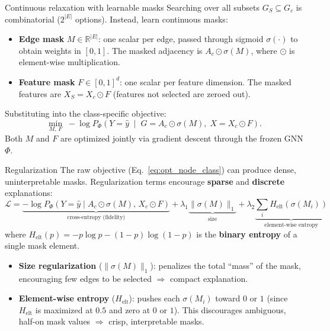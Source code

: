\documentclass[xcolor=svgnames,aspectratio=169]{beamer}
\begin{document}
\begin{frame}{Continuous relaxation with learnable masks}
    Searching over all subsets $G_S \subseteq G_c$ is combinatorial ($2^{|E|}$ options). Instead, learn continuous masks:
    \begin{itemize}
        \item \textbf{Edge mask} $M \in \mathbb{R}^{|E|}$: one scalar per edge, passed through sigmoid $\sigma(\cdot)$ to obtain weights in $[0,1]$.
        The masked adjacency is $A_c \odot \sigma(M)$, where $\odot$ is element-wise multiplication.
        \item \textbf{Feature mask} $F \in [0,1]^{d}$: one scalar per feature dimension.
        The masked features are $X_S = X_c \odot F$ (features not selected are zeroed out).
    \end{itemize}
    \vspace{4pt}
    Substituting into the class-specific objective:
    \begin{equation}
        \label{eq:opt_node_class}
        \min_{M,\, F}  \;-\log P_\Phi\!\left(Y = \hat{y} \;\middle|\; G = A_c \odot \sigma(M),\; X = X_c \odot F\right).
    \end{equation}
    Both $M$ and $F$ are optimized jointly via gradient descent through the frozen GNN $\Phi$.
\end{frame}

\begin{frame}{Regularization}
    The raw objective (Eq.~\ref{eq:opt_node_class}) can produce dense, uninterpretable masks. Regularization terms encourage \textbf{sparse} and \textbf{discrete} explanations:
    \begin{equation}
        \label{eq:full_loss}
        \mathcal{L} = \underbrace{-\log P_\Phi(Y\!=\!\hat{y} \mid A_c \odot \sigma(M),\, X_c \odot F)}_{\text{cross-entropy (fidelity)}}
        + \lambda_1 \underbrace{\|\sigma(M)\|_1}_{\text{size}}
        + \lambda_2 \underbrace{\sum_i H_{\mathrm{elt}}(\sigma(M_i))}_{\text{element-wise entropy}}
    \end{equation}
    where $H_{\mathrm{elt}}(p) = -p\log p - (1-p)\log(1-p)$ is the \textbf{binary entropy} of a single mask element.
    \vspace{4pt}
    \begin{itemize}
        \item \textbf{Size regularization} ($\|\sigma(M)\|_1$): penalizes the total ``mass'' of the mask, encouraging few edges to be selected $\Rightarrow$ compact explanation.
        \item \textbf{Element-wise entropy} ($H_{\mathrm{elt}}$): pushes each $\sigma(M_i)$ toward $0$ or $1$ (since $H_{\mathrm{elt}}$ is maximized at $0.5$ and zero at $0$ or $1$).  This discourages ambiguous, half-on mask values $\Rightarrow$ crisp, interpretable masks.
    \end{itemize}
\end{frame}
\end{document}
